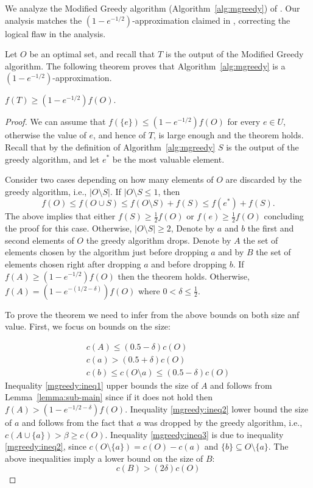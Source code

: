 We analyze the Modified Greedy algorithm (Algorithm~\ref{alg:mgreedy}) of \cite{khuller1999budgeted}.
Our analysis matches the $(1 - e^{-1/2})$-approximation claimed in \cite[]{khuller1999budgeted}, correcting the logical flaw in the analysis.

Let $O$ be an optimal set, and recall that $T$ is the output of the Modified Greedy algorithm.
The following theorem proves that Algorithm~\ref{alg:mgreedy} is a $(1-e^{-1/2})$-approximation.

\begin{theorem}
	$f(T) \geq (1 - e^{-1/2})f(O)$.
\end{theorem}

\begin{proof}
	We can assume that $f(\{e\}) \leq (1 - e^{-1/2})f(O)$ for every $e \in U$, otherwise the value of $e$, and hence of $T$, is large enough and the theorem holds.
	Recall that by the definition of Algorithm~\ref{alg:mgreedy} $S$ is the output of the greedy algorithm, and let $e^*$ be the most valuable element.
	
	Consider two cases depending on how many elements of $O$ are discarded by the greedy algorithm, i.e., $|O \setminus S|$.
	If $|O \setminus S \leq 1$, then 
	$$
	f(O) \leq f(O \cup S) \leq f(O \setminus S) + f(S) \leq f(e^*) + f(S).
	$$
	The above implies that either $f(S) \geq \frac{1}{2}f(O)$ or $f(e) \geq \frac{1}{2}f(O)$ concluding the proof for this case.
	Otherwise, $|O \setminus S| \geq 2$,
	Denote by $a$ and $b$ the first and second elements of $O$ the greedy algorithm drops.
	Denote by $A$ the set of elements chosen by the algorithm just before dropping $a$ and by
	$B$ the set of elements chosen right after dropping $a$ and before dropping $b$.
	If $f(A) \geq (1 - e^{-1/2})f(O)$ then the theorem holds.
	Otherwise, $f(A) = (1 - e^{-(1/2 - \delta)})f(O)$ where $0 < \delta \leq \frac{1}{2}$.

	To prove the theorem we need to infer from the above bounds on both size anf value.
	First, we focus on bounds on the size:

	\begin{align}
		\label{mgreedy:ineq1}
		c(A) \leq (0.5 - \delta)c(O)
		\\
		\label{mgreedy:ineq2}
		c(a) > (0.5 + \delta)c(O)
		\\
		\label{mgreedy:ineq3}
		c(b) \leq c(O \setminus a) \leq (0.5 - \delta)c(O)
	\end{align}
	Inequality \ref{mgreedy:ineq1} upper bounds the size of $A$ and follows from  Lemma~\ref{lemma:sub-main} since if it does not hold then $f(A) > (1 - e^{-1/2 - \delta})f(O)$.
	Inequality \ref{mgreedy:ineq2} lower bound the size of $a$ and follows from the fact that $a$ was dropped by the greedy algorithm, i.e., $c(A \cup \{a\}) > \beta \geq c(O)$. Inequality \ref{mgreedy:ineq3} is due to inequality \ref{mgreedy:ineq2}, since $c(O \setminus \{a\}) = c(O) - c(a)$ and $\{b\} \subseteq O \setminus \{a\}$.
	The above inequalities imply a lower bound  on the size of $B$:
	\begin{equation}
		\label{mgreedy:ineq4}
		c(B) > (2\delta)c(O)
	\end{equation}


\end{proof}
